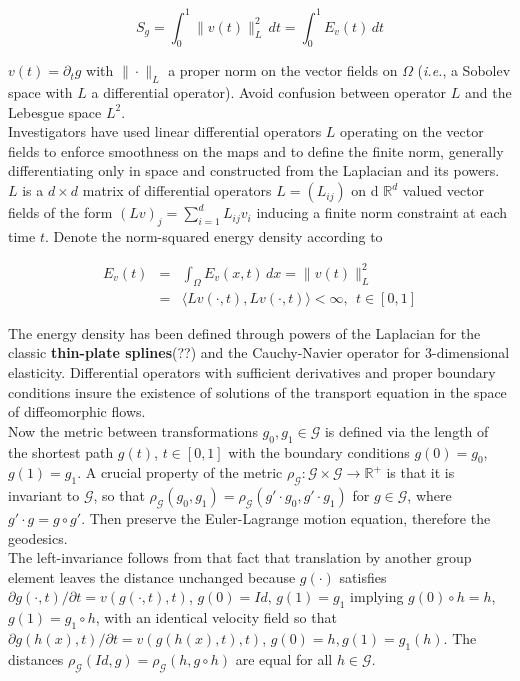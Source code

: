 \documentclass[final, paper=letter,5p,times,twocolumn]{elsarticle}
\theoremstyle{definition}
\begin{document}
$$
S_{g} = \int_{0}^{1} \|v(t)\|_{L}^{2} \,dt = \int_{0}^{1} E_{v}(t) \,dt
$$ 

$v(t) = \partial_{t} g$ with $\| \cdot \|_{L}$ a proper norm on the vector fields on $\Omega$ ({\it i.e.}, a Sobolev space with $L$ a differential operator). Avoid confusion between operator $L$ and the Lebesgue space $L^{2}$.\\

Investigators have used linear differential operators $L$ operating on the vector fields to enforce smoothness on the maps and to define the finite norm, generally differentiating only in space and constructed from the Laplacian and its powers. $L$ is a $d \times d$ matrix of differential operators $L = (L_{ij})$ on d $\mathbb{R}^{d}$ valued vector fields of the form $(Lv)_{j} = \sum_{i = 1}^{d} L_{ij}v_{i}$ inducing a finite norm constraint at each time $t$. Denote the norm-squared energy density according to 

\begin{eqnarray*}
  E_{v}(t) & = & \int_{\Omega}E_{v}(x,t) \, dx = \| v(t)\|_{L}^{2} \\
  & = & \langle Lv(\cdot, t), Lv(\cdot, t) \rangle < \infty, ~~t \in [0,1]
\label{EnergyDensity}
\end{eqnarray*}

The energy density has been defined through powers of the Laplacian for the classic {\bf thin-plate splines}(??) and the Cauchy-Navier operator for 3-dimensional elasticity. Differential operators with sufficient derivatives and proper boundary conditions insure the existence of solutions of the transport equation in the space of diffeomorphic flows.\\

Now the metric between transformations $g_{0}, g_{1} \in \mathcal{G}$ is defined via the length of the shortest path $g(t)$, $t \in [0, 1]$ with the boundary conditions $g(0) = g_{0}$, $g(1) = g_{1}$. A crucial property of the metric $\rho_{\mathcal{G}}: \mathcal{G} \times \mathcal{G} \rightarrow \mathbb{R}^{+}$ is that it is invariant to $\mathcal{G}$, so that $\rho_{\mathcal{G}}(g_{0}, g_{1}) = \rho_{\mathcal{G}}(g' \cdot g_{0}, g' \cdot g_{1})$ for $g \in \mathcal{G}$, where $g' \cdot g = g \circ g'$. Then preserve the Euler-Lagrange motion equation, therefore the geodesics.\\
The left-invariance follows from that fact that translation by another group element leaves the distance unchanged because $g(\cdot)$ satisfies $\partial g(\cdot, t) / \partial t = v(g(\cdot, t), t)$, $g(0) = Id$, $g(1) = g_{1}$ implying $g(0) \circ h = h$, $g(1) = g_{1} \circ h$, with an identical velocity field so that $\partial g(h(x),t)/\partial t = v(g(h(x),t),t)$, $g(0) = h, g(1) = g_{1}(h)$. The distances $\rho_{\mathcal{G}}(Id, g) = \rho_{\mathcal{G}}(h, g \circ h)$ are equal for all $h \in \mathcal{G}$.
\end{document}
